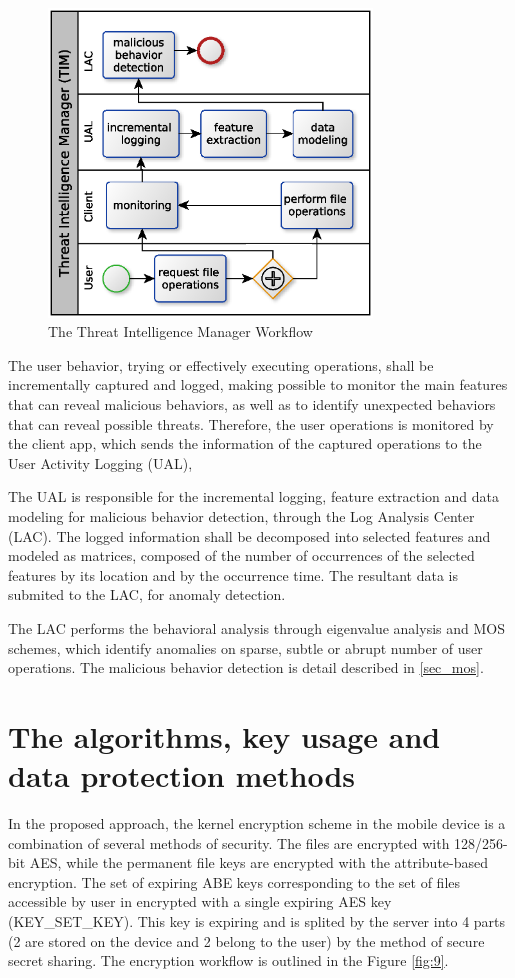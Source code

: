 \documentclass[twocolumn]{svjour3}          %
\begin{document}
\begin{figure}[h!]
	\centering
	\includegraphics[width=8.6cm]{figures/mosworkflow.eps}
	\caption{The Threat Intelligence Manager Workflow}
	\label{fig:8}
\end{figure}

The user behavior, trying or effectively executing operations, shall be incrementally captured and logged, making possible to monitor the main features that can reveal malicious behaviors, as well as to identify unexpected behaviors that can reveal possible threats. Therefore, the user operations is monitored by the client app, which sends the information of the captured operations to the User Activity Logging (UAL), 

The UAL is responsible for the incremental logging, feature extraction and data modeling for malicious behavior detection, through the Log Analysis Center (LAC). The logged information shall be decomposed into selected features and modeled as matrices, composed of the number of occurrences of the selected features by its location and by the occurrence time. The resultant data is submited to the LAC, for anomaly detection.

The LAC performs the behavioral analysis through eigenvalue analysis and MOS schemes, which identify anomalies on sparse, subtle or abrupt number of user operations. The malicious behavior detection is detail described in \ref{sec_mos}.

\section{The algorithms, key usage and data protection methods}
\label{sec_algorithms}
In the proposed approach, the kernel encryption scheme in the mobile device is a combination of several methods of security. The files are encrypted with 128/256-bit AES, while the permanent file keys are encrypted with the attribute-based encryption. The set of expiring ABE keys corresponding to the set of files accessible by user in encrypted with a single expiring AES key (KEY\_SET\_KEY). This key is expiring and is splited by the server into 4 parts (2 are stored on the device and 2 belong to the user) by the method of secure secret sharing. The encryption workflow is outlined in the Figure \ref{fig:9}.
\end{document}
